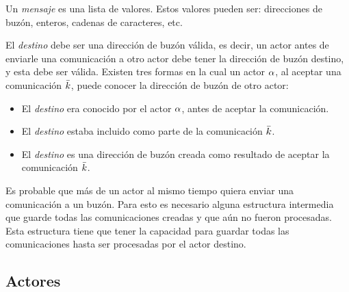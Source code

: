 Un \textit{mensaje} es una lista de valores. Estos valores pueden ser: direcciones de buzón, enteros, cadenas de caracteres, etc. 

El \textit{destino} debe ser una dirección de buzón válida, es decir, un actor antes de enviarle una comunicación a otro actor debe tener la dirección de buzón destino, y esta debe ser válida. Existen tres formas en la cual un actor $\alpha$, al aceptar una comunicación $\bar{k}$, puede conocer la dirección de buzón de otro actor:

\begin{itemize}
 \item El \textit{destino} era conocido por el actor $\alpha$, antes de aceptar la comunicación.
 \item El \textit{destino} estaba incluido como parte de la comunicación $\bar{k}$.
 \item El \textit{destino} es una dirección de buzón creada como resultado de aceptar la comunicación $\bar{k}$.
\end{itemize}

Es probable que más de un actor al mismo tiempo quiera enviar una comunicación a un buzón. Para esto es necesario alguna estructura intermedia que guarde todas las comunicaciones creadas y que aún no fueron procesadas. Esta estructura tiene que tener la capacidad para guardar todas las comunicaciones hasta ser procesadas por el actor destino. 



\subsection{Actores}

